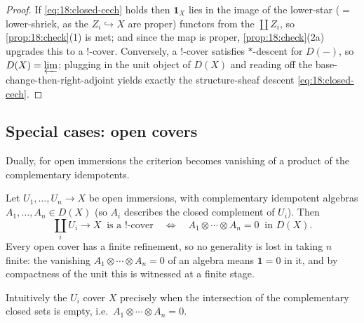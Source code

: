 \begin{proof}
If \eqref{eq:18:closed-cech} holds then $\mathbf 1_X$ lies in the image of the
lower-star ($=$ lower-shriek, as the $Z_i\hookrightarrow X$ are proper) functors
from the $\coprod Z_i$, so \cref{prop:18:check}(1) is met; and since the map is
proper, \cref{prop:18:check}(2a) upgrades this to a $!$-cover. Conversely, a
$!$-cover satisfies $*$-descent for $D(-)$, so $D(X)=\varprojlim$; plugging in the
unit object of $D(X)$ and reading off the base-change-then-right-adjoint yields
exactly the structure-sheaf descent \eqref{eq:18:closed-cech}.
\end{proof}

\subsection{Special cases: open covers}
\label{subsec:18:open}

Dually, for open immersions the criterion becomes vanishing of a product of the
complementary idempotents.

\begin{proposition}
\label{prop:18:open-cover}
Let $U_1,\dots,U_n\to X$ be open immersions, with complementary idempotent algebras
$A_1,\dots,A_n\in D(X)$ (so $A_i$ describes the closed complement of $U_i$). Then
\begin{equation*}
\coprod_i U_i\to X\ \text{ is a $!$-cover}\quad\Longleftrightarrow\quad A_1\otimes\cdots\otimes A_n=0\ \text{ in }D(X).
\end{equation*}
Every open cover has a finite refinement, so no generality is lost in taking $n$
finite: the vanishing $A_1\otimes\cdots\otimes A_n=0$ of an algebra means
$\mathbf 1=0$ in it, and by compactness of the unit this is witnessed at a finite
stage.
\end{proposition}

Intuitively the $U_i$ cover $X$ precisely when the intersection of the
complementary closed sets is empty, i.e.\ $A_1\otimes\cdots\otimes A_n=0$.

